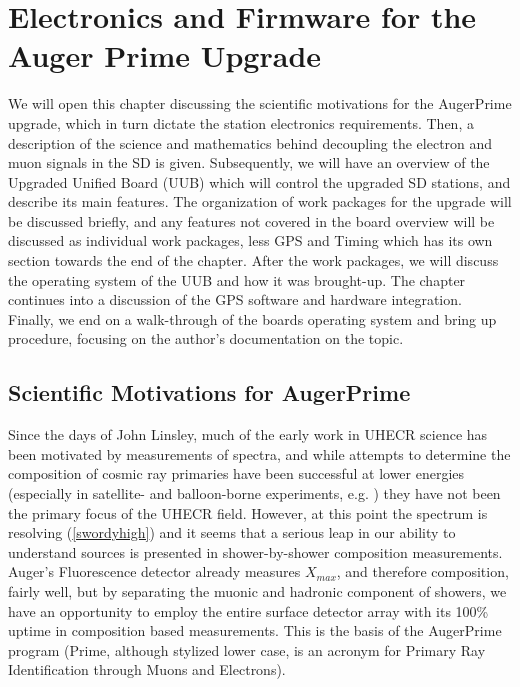 
\chapter{Electronics and Firmware for the Auger Prime Upgrade}
\label{electronics}
We will open this chapter discussing the scientific motivations for the AugerPrime upgrade, which in turn dictate the station electronics requirements. Then, a description of the science and mathematics behind decoupling the electron and muon signals in the SD is given. Subsequently, we will have an overview of the Upgraded Unified Board (UUB) which will control the upgraded SD stations, and describe its main features. The organization of work packages for the upgrade will be discussed briefly, and any features not covered in the board overview will be discussed as individual work packages, less GPS and Timing which has its own section towards the end of the chapter. After the work packages, we will discuss the operating system of the UUB and how it was brought-up. The chapter continues into a discussion of the GPS software and hardware integration. Finally, we end on a walk-through of the boards operating system and bring up procedure, focusing on the author's documentation on the topic. %
\section{Scientific Motivations for AugerPrime}
Since the days of John Linsley, much of the early work in UHECR science has been motivated by measurements of spectra, and while attempts to determine the composition of cosmic ray primaries have been successful at lower energies (especially in satellite- and balloon-borne experiments, e.g. \textcite{tiger}) they have not been the primary focus of the UHECR field. However, at this point the spectrum is resolving (\autoref{swordyhigh}) and it seems that a serious leap in our ability to understand sources is presented in shower-by-shower composition measurements. Auger's Fluorescence detector already measures $X_{max}$, and therefore composition, fairly well, but by separating the muonic and hadronic component of showers, we have an opportunity to employ the entire surface detector array with its 100\% uptime in composition based measurements. This is the basis of the AugerPrime program (Prime, although stylized lower case, is an acronym for Primary Ray Identification through Muons and Electrons).

